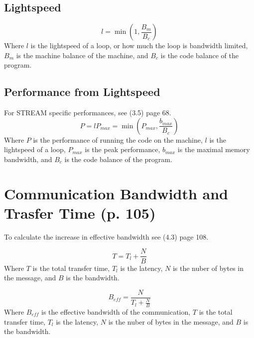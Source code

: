 \documentclass{article}
\begin{document}
		\subsection{Lightspeed}
			\begin{equation}
				l=\min\left(1,\frac{B_m}{B_c}\right)
			\end{equation}
			Where $l$ is the lightspeed of a loop, or how much the loop is bandwidth limited, $B_m$ is the machine balance of the machine, and $B_c$ is the code balance of the program.
		
		\subsection{Performance from Lightspeed}
			For STREAM specific performances, see (3.5) page 68.
			\begin{equation}
				P=lP_{max}=\min\left(P_{max},\frac{b_{max}}{B_c}\right)
			\end{equation}
			Where $P$ is the performance of running the code on the machine, $l$ is the lightspeed of a loop, $P_{max}$ is the peak performance, $b_{max}$ is the maximal memory bandwidth, and $B_c$ is the code balance of the program.
	
	\section{Communication Bandwidth and Trasfer Time (p. 105)}
		To calculate the increase in effective bandwidth see (4.3) page 108.

		\begin{equation}
			T=T_l+\frac{N}{B}
		\end{equation}
		Where $T$ is the total transfer time, $T_l$ is the latency, $N$ is the nuber of bytes in the message, and $B$ is the bandwidth.

		\begin{equation}
			B_{eff}=\frac{N}{T_l+\frac{N}{B}}
		\end{equation}
		Where $B_{eff}$ is the effective bandwidth of the communication, $T$ is the total transfer time, $T_l$ is the latency, $N$ is the nuber of bytes in the message, and $B$ is the bandwidth.
\end{document}
